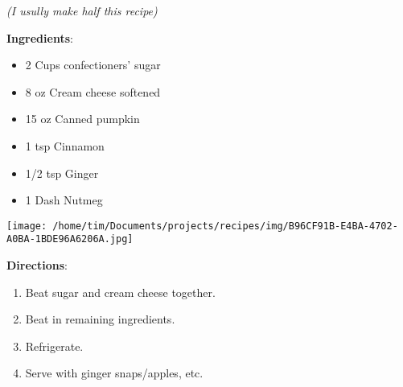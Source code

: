 \documentclass[11pt, twoside, openany]{book}
\begin{document}
 \label{pumpkin-dip}\hfill\textit{(I usully make half this recipe)}\\
\begin{minipage}[t]{0.8\linewidth}
\textbf{Ingredients}:\vspace{-3mm}
\begin{multicols}{2}
\begin{itemize}\setlength\itemsep{-1mm}
\item 2 Cups confectioners' sugar
\item 8 oz Cream cheese softened
\item 15 oz Canned pumpkin
\item 1 tsp Cinnamon
\item 1/2 tsp Ginger
\item 1 Dash Nutmeg
\end{itemize}
\end{multicols}
\end{minipage}
\begin{minipage}[t]{0.2\linewidth}
\centering \strut\vspace*{-\baselineskip}\newline
\texttt{[image: /home/tim/Documents/projects/recipes/img/B96CF91B-E4BA-4702-A0BA-1BDE96A6206A.jpg]}\\
\end{minipage}\vspace{3mm}
\textbf{Directions}:
\vspace{-3mm}\begin{enumerate}\setlength\itemsep{-1mm}
\item Beat sugar and cream cheese together.
\item Beat in remaining ingredients.
\item Refrigerate.
\item Serve with ginger snaps/apples, etc.
\end{enumerate}
 \label{nice-'n'-soft-sugar-cookies-recipe}\hfill\textit{}\\
\end{document}
